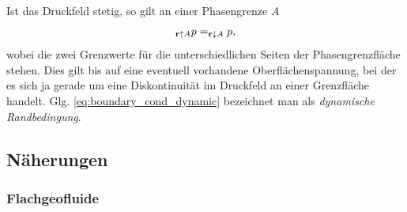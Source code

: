 \documentclass{book}
\let\lim\relax
\DeclareMathOperator*{\lim}{\text{lim}}
\begin{document}
Ist das Druckfeld stetig, so gilt an einer Phasengrenze $A$
%
\begin{eqnarray}
\lim_{\mathbf{r} \uparrow A} p = \lim_{\mathbf{r} \downarrow A} p,\label{eq:boundary_cond_dynamic}
\end{eqnarray}
%
wobei die zwei Grenzwerte für die unterschiedlichen Seiten der Phasengrenzfläche stehen. Dies gilt bis auf eine eventuell vorhandene Oberflächenspannung, bei der es sich ja gerade um eine Diskontinuität im Druckfeld an einer Grenzfläche handelt. Glg. \eqref{eq:boundary_cond_dynamic} bezeichnet man als \textit{dynamische Randbedingung}.

\subsection{Näherungen}
\label{sec:naeherungen}

\subsubsection{Flachgeofluide}
\label{sec:flachgeofluide}
\end{document}

